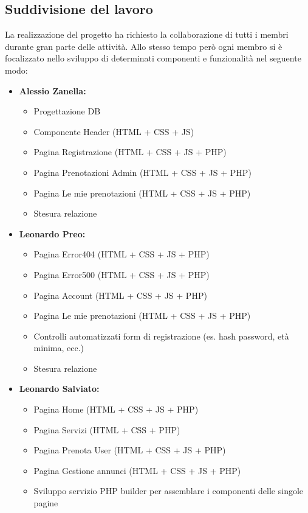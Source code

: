 \documentclass{article}
\begin{document}
\subsection{Suddivisione del lavoro}
La realizzazione del progetto ha richiesto la collaborazione di tutti i membri durante gran parte delle attività. Allo stesso tempo però ogni membro si è focalizzato nello sviluppo di determinati componenti e funzionalità nel seguente modo:
\begin{itemize}
    \item \textbf{Alessio Zanella:}
    \begin{itemize}
        \item Progettazione DB
        \item Componente Header (HTML + CSS + JS)
        \item Pagina Registrazione (HTML + CSS + JS + PHP)
        \item Pagina Prenotazioni Admin (HTML + CSS + JS + PHP)
        \item Pagina Le mie prenotazioni (HTML + CSS + JS + PHP)
        \item Stesura relazione
    \end{itemize}
    \item \textbf{Leonardo Preo:}
    \begin{itemize}
        \item Pagina Error404 (HTML + CSS + JS + PHP)
        \item Pagina Error500 (HTML + CSS + JS + PHP)
        \item Pagina Account (HTML + CSS + JS + PHP)
        \item Pagina Le mie prenotazioni (HTML + CSS + JS + PHP)
        \item Controlli automatizzati form di registrazione (es. hash password, età minima, ecc.)
        \item Stesura relazione
    \end{itemize}
    \item \textbf{Leonardo Salviato:}
    \begin{itemize}
        \item Pagina Home (HTML + CSS + JS + PHP)
        \item Pagina Servizi (HTML + CSS + PHP)
        \item Pagina Prenota User (HTML + CSS + JS + PHP)
        \item Pagina Gestione annunci (HTML + CSS + JS + PHP)
        \item Sviluppo servizio PHP builder per assemblare i componenti delle singole pagine

\end{itemize}
\end{itemize}
\end{document}
